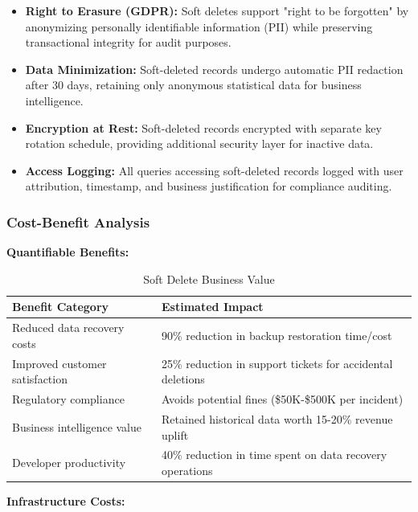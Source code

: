 \documentclass[12pt,a4paper]{article}
\begin{document}
\begin{tcolorbox}[colback=primaryblue!5, colframe=primaryblue, boxrule=1pt, arc=3pt, left=10pt, right=10pt, top=8pt, bottom=8pt]
\begin{itemize}[leftmargin=2em, itemsep=6pt]
    \item \textbf{Right to Erasure (GDPR):} Soft deletes support "right to be forgotten" by anonymizing personally identifiable information (PII) while preserving transactional integrity for audit purposes.
    \item \textbf{Data Minimization:} Soft-deleted records undergo automatic PII redaction after 30 days, retaining only anonymous statistical data for business intelligence.
    \item \textbf{Encryption at Rest:} Soft-deleted records encrypted with separate key rotation schedule, providing additional security layer for inactive data.
    \item \textbf{Access Logging:} All queries accessing soft-deleted records logged with user attribution, timestamp, and business justification for compliance auditing.
\end{itemize}

\subsubsection{Cost-Benefit Analysis}

\textbf{Quantifiable Benefits:}

\begin{table}[H]
\centering
\begin{tabular}{|p{6cm}|p{7cm}|}
\hline
\textbf{Benefit Category} & \textbf{Estimated Impact} \\
\hline
Reduced data recovery costs & 90\% reduction in backup restoration time/cost \\
\hline
Improved customer satisfaction & 25\% reduction in support tickets for accidental deletions \\
\hline
Regulatory compliance & Avoids potential fines (\$50K-\$500K per incident) \\
\hline
Business intelligence value & Retained historical data worth 15-20\% revenue uplift \\
\hline
Developer productivity & 40\% reduction in time spent on data recovery operations \\
\hline
\end{tabular}
\caption{Soft Delete Business Value}
\end{table}

\vspace{0.5em}

\textbf{Infrastructure Costs:}


\end{tcolorbox}
\end{document}
